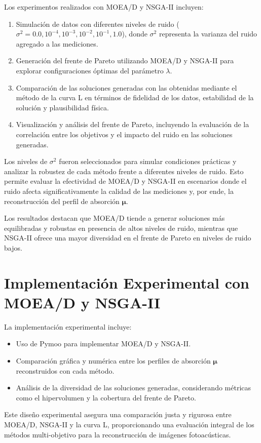 Los experimentos realizados con MOEA/D y NSGA-II incluyen:
\begin{enumerate}
    \item Simulación de datos con diferentes niveles de ruido (\( \sigma^2 = 0.0, 10^{-4}, 10^{-3}, 10^{-2}, 10^{-1}, 1.0 \)), donde \( \sigma^2 \) representa la varianza del ruido agregado a las mediciones.
    \item Generación del frente de Pareto utilizando MOEA/D y NSGA-II para explorar configuraciones óptimas del parámetro \( \lambda \).
    \item Comparación de las soluciones generadas con las obtenidas mediante el método de la curva L en términos de fidelidad de los datos, estabilidad de la solución y plausibilidad física.
    \item Visualización y análisis del frente de Pareto, incluyendo la evaluación de la correlación entre los objetivos y el impacto del ruido en las soluciones generadas.
\end{enumerate}

Los niveles de \( \sigma^2 \) fueron seleccionados para simular condiciones prácticas y analizar la robustez de cada método frente a diferentes niveles de ruido. Esto permite evaluar la efectividad de MOEA/D y NSGA-II en escenarios donde el ruido afecta significativamente la calidad de las mediciones y, por ende, la reconstrucción del perfil de absorción \( \mathbf{\mu} \).

Los resultados destacan que MOEA/D tiende a generar soluciones más equilibradas y robustas en presencia de altos niveles de ruido, mientras que NSGA-II ofrece una mayor diversidad en el frente de Pareto en niveles de ruido bajos.

\section{Implementación Experimental con MOEA/D y NSGA-II} \label{sec:method:implementation}

La implementación experimental incluye:
\begin{itemize}
    \item Uso de Pymoo para implementar MOEA/D y NSGA-II.
    \item Comparación gráfica y numérica entre los perfiles de absorción \( \mathbf{\mu} \) reconstruidos con cada método.
    \item Análisis de la diversidad de las soluciones generadas, considerando métricas como el hipervolumen y la cobertura del frente de Pareto.
\end{itemize}

Este diseño experimental asegura una comparación justa y rigurosa entre MOEA/D, NSGA-II y la curva L, proporcionando una evaluación integral de los métodos multi-objetivo para la reconstrucción de imágenes fotoacústicas.
